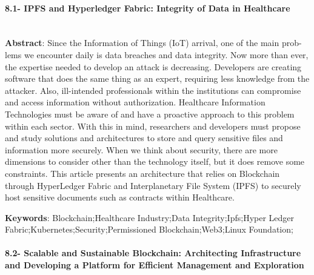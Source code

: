 \paragraph{8.1- IPFS and Hyperledger Fabric: Integrity of Data in Healthcare}\mbox{}\\

\textbf{Abstract}: Since the Information of Things (IoT) arrival, one of the main prob-
lems we encounter daily is data breaches and data integrity. Now more than ever,
the expertise needed to develop an attack is decreasing. Developers are creating
software that does the same thing as an expert, requiring less knowledge from the
attacker. Also, ill-intended professionals within the institutions can compromise
and access information without authorization.
Healthcare Information Technologies must be aware of and have a proactive
approach to this problem within each sector. With this in mind, researchers
and developers must propose and study solutions and architectures to store and
query sensitive files and information more securely.
When we think about security, there are more dimensions to consider other
than the technology itself, but it does remove some constraints. This article
presents an architecture that relies on Blockchain through HyperLedger Fabric
and Interplanetary File System (IPFS) to securely host sensitive documents such
as contracts within Healthcare.
\vspace{1cm}

\textbf{Keywords}: Blockchain;Healthcare Industry;Data Integrity;Ipfs;Hyper Ledger
Fabric;Kubernetes;Security;Permissioned Blockchain;Web3;Linux Foundation;

\paragraph{8.2- Scalable and Sustainable Blockchain: Architecting Infrastructure and Developing a Platform for Efficient Management and Exploration}\mbox{}\\


